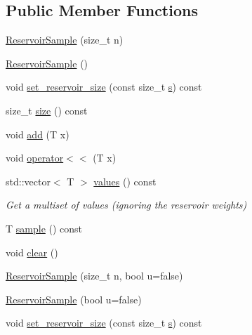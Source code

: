 \subsection*{Public Member Functions}
\begin{DoxyCompactItemize}
\item 
\hyperlink{class_fleet_1_1_statistics_1_1_reservoir_sample_abb55ffa67b77f065407ec465c76c4eba}{Reservoir\+Sample} (size\+\_\+t n)
\item 
\hyperlink{class_fleet_1_1_statistics_1_1_reservoir_sample_abdbd4aeeed89ff5c6238fb64380faed0}{Reservoir\+Sample} ()
\item 
void \hyperlink{class_fleet_1_1_statistics_1_1_reservoir_sample_adabe7f40c91657950a67df7d20ace543}{set\+\_\+reservoir\+\_\+size} (const size\+\_\+t \hyperlink{class_fleet_1_1_statistics_1_1_reservoir_sample_a7cf0266d882988e2a61b857d123c8b58}{s}) const
\item 
size\+\_\+t \hyperlink{class_fleet_1_1_statistics_1_1_reservoir_sample_abdfad455c8b8da8cb2ab30d0f60053e0}{size} () const
\item 
void \hyperlink{class_fleet_1_1_statistics_1_1_reservoir_sample_a96005aae9818ace5255f2af95a631c66}{add} (T x)
\item 
void \hyperlink{class_fleet_1_1_statistics_1_1_reservoir_sample_ad6e4d50ef1acefce7f5d66013720c1ef}{operator$<$$<$} (T x)
\item 
std\+::vector$<$ T $>$ \hyperlink{class_fleet_1_1_statistics_1_1_reservoir_sample_a385d8640b316ff2e75f5da30948d8a35}{values} () const
\begin{DoxyCompactList}\small\item\em Get a multiset of values (ignoring the reservoir weights) \end{DoxyCompactList}\item 
T \hyperlink{class_fleet_1_1_statistics_1_1_reservoir_sample_a1b66a8f27512ebd6a48370621a43db87}{sample} () const
\item 
void \hyperlink{class_fleet_1_1_statistics_1_1_reservoir_sample_aadf45c574db6a4ab93da3df2b3f1df03}{clear} ()
\item 
\hyperlink{class_fleet_1_1_statistics_1_1_reservoir_sample_a0dde0cb8cfbb14a0bbf8db7f4bb316e9}{Reservoir\+Sample} (size\+\_\+t n, bool u=false)
\item 
\hyperlink{class_fleet_1_1_statistics_1_1_reservoir_sample_a39c8b405654eaca4c943263a485bc015}{Reservoir\+Sample} (bool u=false)
\item 
void \hyperlink{class_fleet_1_1_statistics_1_1_reservoir_sample_adabe7f40c91657950a67df7d20ace543}{set\+\_\+reservoir\+\_\+size} (const size\+\_\+t \hyperlink{class_fleet_1_1_statistics_1_1_reservoir_sample_a7cf0266d882988e2a61b857d123c8b58}{s}) const

\end{DoxyCompactItemize}
